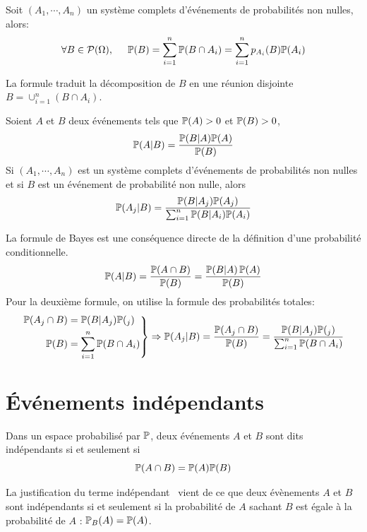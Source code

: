 \begin{prop}
Soit $(A_1,\cdots,A_n)$ un système complets d'événements de probabilités non nulles, alors: 
\begin{displaymath}
\forall B\in \mathcal{P}(\Omega),\hspace{0.5cm} \mathbb{P}(B) = \sum_{i=1}^{n}\mathbb{P}(B\cap A_i) = \sum_{i=1}^{n}p_{A_i}(B)\mathbb{P}(A_i)
\end{displaymath}
\end{prop}
\begin{demo}
  La formule traduit la décomposition de $B$ en une réunion disjointe $B = \cup_{i=1}^{n}(B\cap A_i)$.
\end{demo}
\newpage
{}
\begin{prop}
 Soient $A$ et $B$ deux événements tels que $\mathbb{P}(A)>0$ et $\mathbb{P}(B)>0$,
\begin{displaymath}
 \mathbb{P}(A|B) = \frac{\mathbb{P}(B|A)\mathbb{P}(A)}{\mathbb{P}(B)}
\end{displaymath}
Si $(A_1,\cdots,A_n)$ est un système complets d'événements de probabilités non nulles et si $B$ est un événement de probabilité non nulle, alors
\begin{displaymath}
 \mathbb{P}(A_j|B) = \frac{\mathbb{P}(B|A_j) \mathbb{P}(A_j)}{\sum_{i=1}^n\mathbb{P}(B|A_i)\mathbb{P}(A_i)}
\end{displaymath}
\end{prop}
\begin{demo}
  La formule de Bayes est une conséquence directe de la définition d'une probabilité conditionnelle.
\begin{displaymath}
  \mathbb{P}(A|B) = \frac{\mathbb{P}(A\cap B)}{\mathbb{P}(B)} = \frac{\mathbb{P}(B|A)\, \mathbb{P}(A)}{\mathbb{P}(B)}
\end{displaymath}
Pour la deuxième formule, on utilise la formule des probabilités totales:
\begin{displaymath}
\left. 
\begin{aligned}
\mathbb{P}(A_j \cap B) &= \mathbb{P}(B| A_j)\mathbb{P}(_j) \\
\mathbb{P}(B) &= \sum_{i=1}^{n}\mathbb{P}(B\cap A_i)
\end{aligned}
\right\rbrace \Rightarrow
\mathbb{P}(A_j|B) = \frac{\mathbb{P}(A_j \cap B)}{\mathbb{P}(B)} = \frac{\mathbb{P}(B| A_j)\mathbb{P}(_j)}{\sum_{i=1}^{n}\mathbb{P}(B\cap A_i)}
\end{displaymath}
\end{demo}
\clearpage

\section{\'Evénements indépendants}
\begin{defi}
Dans un espace probabilisé par $\mathbb{P}$, deux événements $A$ et $B$ sont dits indépendants si et seulement si 
\begin{displaymath}
  \mathbb{P}(A\cap B) = \mathbb{P}(A)\mathbb{P}(B)
\end{displaymath}  
\end{defi}
\begin{rem}
 La justification du terme \og indépendant\fg~ vient de ce que deux évènements $A$ et $B$ sont indépendants si et seulement si la probabilité de $A$ sachant $B$ est égale à la probabilité de $A$ : $\mathbb{P}_B(A) = \mathbb{P}(A)$.
\end{rem}

